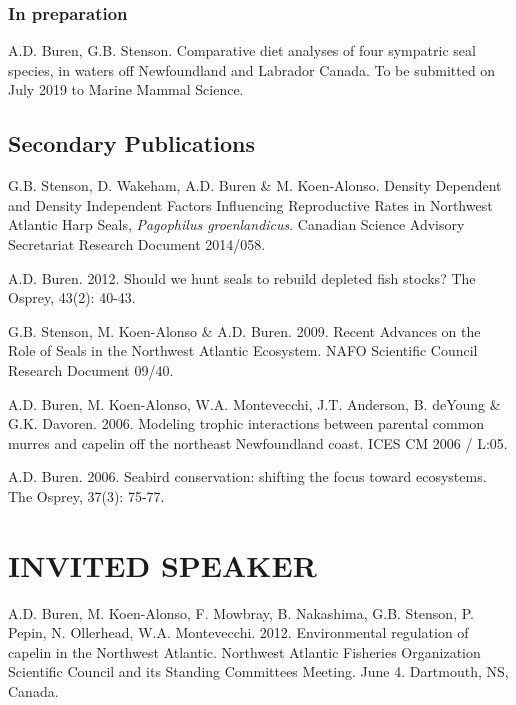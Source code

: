 \documentclass{res}
\begin{document}
\begin{resume}
\begin{hangparas}{.4in}{1}
\end{hangparas}
\subsubsection{In preparation}
\begin{hangparas}{.4in}{1}

A.D. Buren, G.B. Stenson. Comparative diet analyses of four sympatric seal species, in waters off Newfoundland and Labrador Canada. To be submitted on July 2019 to Marine Mammal Science.


 
\end{hangparas}

\subsection{Secondary Publications}
\begin{hangparas}{.4in}{1}
	
G.B. Stenson, D. Wakeham, A.D. Buren \& M. Koen-Alonso. Density Dependent and Density Independent Factors Influencing Reproductive Rates in Northwest Atlantic Harp Seals, \textit{Pagophilus groenlandicus}. Canadian Science Advisory Secretariat Research Document 	2014/058.

A.D. Buren. 2012. Should we hunt seals to rebuild depleted fish stocks? The Osprey, 43(2): 40-43.

G.B. Stenson, M. Koen-Alonso \& A.D. Buren. 2009. Recent Advances on the Role of Seals in the Northwest Atlantic Ecosystem. NAFO Scientific Council Research Document 09/40.

A.D. Buren, M. Koen-Alonso, W.A. Montevecchi, J.T. Anderson, B. deYoung \& G.K. Davoren. 2006. Modeling trophic interactions between parental common murres and capelin off the northeast Newfoundland coast. ICES CM 2006 / L:05.

A.D. Buren. 2006. Seabird conservation: shifting the focus toward ecosystems. The Osprey, 37(3): 75-77.

\end{hangparas}

\section{INVITED SPEAKER}
\vspace{0.1in} 
\begin{hangparas}{.4in}{1}
	A.D. Buren, M. Koen-Alonso, F. Mowbray, B. Nakashima, G.B. Stenson, P. Pepin, N. Ollerhead, W.A. Montevecchi. 2012. Environmental regulation of capelin in the Northwest Atlantic. Northwest Atlantic Fisheries Organization Scientific Council and its Standing Committees Meeting. June 4. Dartmouth, NS, Canada.
	

\end{hangparas}
\end{resume}
\end{document}
